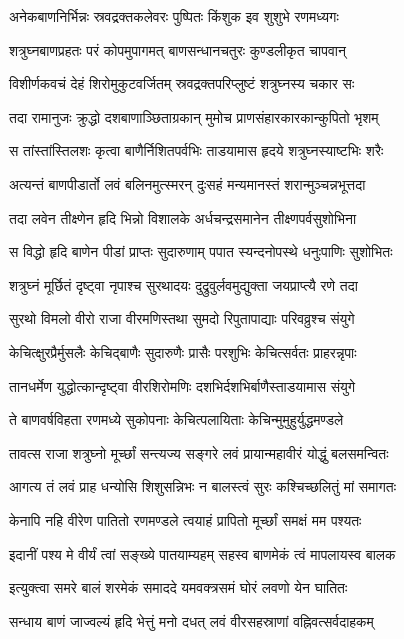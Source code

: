 \twolineshloka
{अनेकबाणनिर्भिन्नः स्रवद्रक्तकलेवरः}
{पुष्पितः किंशुक इव शुशुभे रणमध्यगः}%

\twolineshloka
{शत्रुघ्नबाणप्रहतः परं कोपमुपागमत्}
{बाणसन्धानचतुरः कुण्डलीकृत चापवान्}%

\twolineshloka
{विशीर्णकवचं देहं शिरोमुकुटवर्जितम्}
{स्रवद्रक्तपरिप्लुष्टं शत्रुघ्नस्य चकार सः}%

\twolineshloka
{तदा रामानुजः क्रुद्धो दशबाणाञ्छिताग्रकान्}
{मुमोच प्राणसंहारकारकान्कुपितो भृशम्}%

\twolineshloka
{स तांस्तांस्तिलशः कृत्वा बाणैर्निशितपर्वभिः}
{ताडयामास हृदये शत्रुघ्नस्याष्टभिः शरैः}%

\twolineshloka
{अत्यन्तं बाणपीडार्तो लवं बलिनमुत्स्मरन्}
{दुःसहं मन्यमानस्तं शरान्मुञ्चन्नभूत्तदा}%

\twolineshloka
{तदा लवेन तीक्ष्णेन हृदि भिन्नो विशालके}
{अर्धचन्द्रसमानेन तीक्ष्णपर्वसुशोभिना}%

\twolineshloka
{स विद्धो हृदि बाणेन पीडां प्राप्तः सुदारुणाम्}
{पपात स्यन्दनोपस्थे धनुःपाणिः सुशोभितः}%

\twolineshloka
{शत्रुघ्नं मूर्छितं दृष्ट्वा नृपाश्च सुरथादयः}
{दुद्रुवुर्लवमुद्युक्ता जयप्राप्त्यै रणे तदा}%

\twolineshloka
{सुरथो विमलो वीरो राजा वीरमणिस्तथा}
{सुमदो रिपुतापाद्याः परिवव्रुश्च संयुगे}%

\twolineshloka
{केचित्क्षुरप्रैर्मुसलैः केचिद्बाणैः सुदारुणैः}
{प्रासैः परशुभिः केचित्सर्वतः प्राहरन्नृपाः}%

\twolineshloka
{तानधर्मेण युद्धोत्कान्दृष्ट्वा वीरशिरोमणिः}
{दशभिर्दशभिर्बाणैस्ताडयामास संयुगे}%

\twolineshloka
{ते बाणवर्षविहता रणमध्ये सुकोपनाः}
{केचित्पलायिताः केचिन्मुमुहुर्युद्धमण्डले}%

\twolineshloka
{तावत्स राजा शत्रुघ्नो मूर्च्छां सन्त्यज्य सङ्गरे}
{लवं प्रायान्महावीरं योद्धुं बलसमन्वितः}%

\twolineshloka
{आगत्य तं लवं प्राह धन्योसि शिशुसन्निभः}
{न बालस्त्वं सुरः कश्चिच्छलितुं मां समागतः}%

\twolineshloka
{केनापि नहि वीरेण पातितो रणमण्डले}
{त्वयाहं प्रापितो मूर्च्छां समक्षं मम पश्यतः}%

\twolineshloka
{इदानीं पश्य मे वीर्यं त्वां सङ्ख्ये पातयाम्यहम्}
{सहस्व बाणमेकं त्वं मापलायस्व बालक}%

\twolineshloka
{इत्युक्त्वा समरे बालं शरमेकं समाददे}
{यमवक्त्रसमं घोरं लवणो येन घातितः}%

\twolineshloka
{सन्धाय बाणं जाज्वल्यं हृदि भेत्तुं मनो दधत्}
{लवं वीरसहस्राणां वह्निवत्सर्वदाहकम्}%

